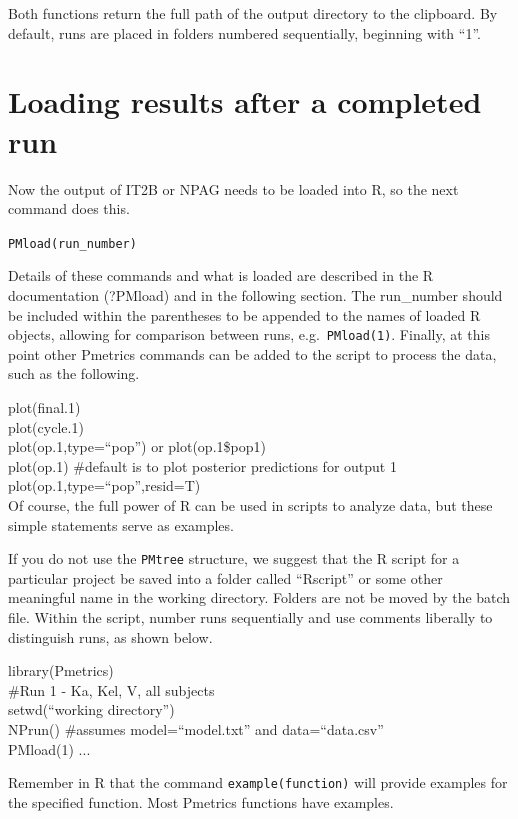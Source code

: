 \documentclass[
]{book}
\begin{document}
Both functions return the full path of the output directory to
the clipboard. By default, runs are placed in folders numbered
sequentially, beginning with ``1''.

\hypertarget{loading-results-after-a-completed-run}{%
\section{Loading results after a completed run}\label{loading-results-after-a-completed-run}}

Now the output of IT2B or NPAG needs to be loaded into R, so the next
command does this.

\texttt{PMload(run\_number)}

Details of these commands and what is loaded are described in the R
documentation (?PMload) and in the following section. The run\_number
should be included within the parentheses to be appended to the names of
loaded R objects, allowing for comparison between runs, e.g.~\texttt{PMload(1)}.
Finally, at this point other Pmetrics commands can be added to the
script to process the data, such as the following.

plot(final.1)\\
plot(cycle.1)\\
plot(op.1,type=``pop'') or plot(op.1\$pop1)\\
plot(op.1) \#default is to plot posterior predictions for output 1\\
plot(op.1,type=``pop'',resid=T)\\

Of course, the full power of R can be used in scripts to analyze data,
but these simple statements serve as examples.

If you do not use the \texttt{PMtree} structure, we suggest that the R script
for a particular project be saved into a folder called ``Rscript'' or some
other meaningful name in the working directory. Folders are not be moved
by the batch file. Within the script, number runs sequentially and use
comments liberally to distinguish runs, as shown below.

library(Pmetrics)\\
\#Run 1 - Ka, Kel, V, all subjects\\
setwd(``working directory'')\\
NPrun() \#assumes model=``model.txt'' and data=``data.csv''\\
PMload(1)
...

Remember in R that the command \texttt{example(function)} will provide examples
for the specified function. Most Pmetrics functions have examples.
\end{document}
